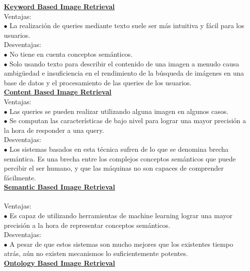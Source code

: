 \documentclass{llncs}
\begin{document}
\underline {\bf Keyword Based Image Retrieval}\\

Ventajas:\\
\noindent$\bullet$ La realizaci\'on de queries mediante texto suele ser m\'as intuitiva y f\'acil para los usuarios.\\

Desventajas:\\
\noindent$\bullet$ No tiene en cuenta conceptos sem\'anticos.\\
$\bullet$ Solo usando texto para describir el contenido de una imagen a menudo causa ambig\"{u}edad e insuficiencia en el rendimiento
de la b\'usqueda de im\'agenes en una base de datos y el procesamiento de las queries de los usuarios.\\

\underline {\bf Content Based Image Retrieval}\\

Ventajas:\\
\noindent$\bullet $ Las queries se pueden realizar utilizando alguna imagen en algunos casos.\\
$\bullet $ Se computan las caracter\'isticas de bajo nivel para lograr una mayor precisi\'on a la hora de responder a una 
query.\\

Desventajas:\\
\noindent$\bullet$ Los sistemas basados en esta t\'ecnica sufren de lo que se denomina brecha sem\'antica. Es una brecha 
entre los complejos conceptos sem\'anticos que puede percibir el ser humano, y que las m\'aquinas no son capaces de
comprender f\'acilmente.\\

\underline {\bf Semantic Based Image Retrieval}\\\\

Ventajas:\\
\noindent$\bullet$ Es capaz de utilizando herramientas de machine learning lograr una mayor precisi\'on a la hora de representar conceptos sem\'anticos.\\

Desventajas:\\
$\bullet$ A pesar de que estos sistemas son mucho mejores que los existentes tiempo atr\'as, a\'un no existen mecanismos lo suficientemente potentes.\\

\underline {\bf Ontology Based Image Retrieval}\\\\
\end{document}
